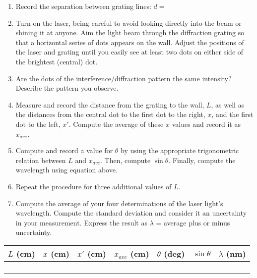 \begin{enumerate}
\item Record the separation between grating lines: \( d= \)
\item Turn on the laser, being careful to avoid looking directly into the
beam or shining it at anyone. Aim the light beam through the diffraction
grating so that a horizontal series of dots appears on the wall. Adjust
the positions of the laser and grating until you easily see at least
two dots on either side of the brightest (central) dot.
\item Are the dots of the interference/diffraction pattern the same intensity?
Describe the pattern you observe.\vspace{15mm}

\item Measure and record the distance from the grating to the wall, $L$,
as well as the distances from the central dot to the first dot to
the right, $x$, and the first dot to the left, $x'$. Compute the average
of these $x$ values and record it as $x_{ave}$.
\item Compute and record a value for $\theta$ by using the appropriate trigonometric
relation between $L$ and $x_{ave}$. Then, compute $\sin \theta$. Finally,
compute the wavelength using equation above.
\item Repeat the procedure for three additional values of $L$.
\item Compute the average of your four determinations of the laser light's
wavelength. Compute the standard deviation and consider it an uncertainty in 
your measurement. Express the result as $\lambda$ = average plus or minus 
uncertainty.
\vspace{15mm}

\end{enumerate}
\vspace{0.3cm}
\begin{center}
\begin{tabular}{|c|c|c|c|c|c|c|}
\hline 
\( L \) (cm)&
\( x \) (cm)&
\( x' \) (cm)&
\( x_{ave} \) (cm)&
\( \theta  \) (deg)&
\( \sin \theta  \)&
\( \lambda  \) (nm)\\
\hline
\hline 
&
&
&
&
&
&
\\
\hline 
&
&
&
&
&
&
\\
\hline 
&
&
&
&
&
&
\\
\hline 
&
&
&
&
&
&
\\
\hline
\end{tabular}\vspace{0.3cm}

\end{center}
